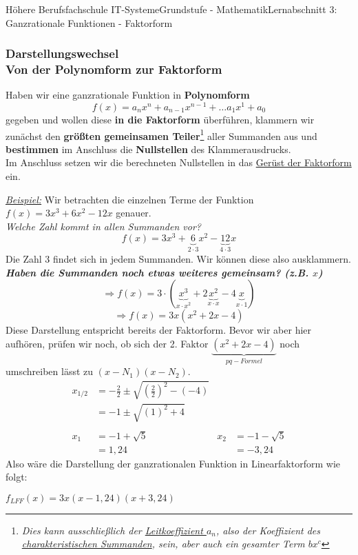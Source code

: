 \documentclass[11pt,twocolumn,oneside,openany,headings=optiontotoc,11pt,numbers=noenddot]{article}
\begin{document}
\begin{worksheet}{Höhere Berufsfachschule IT-Systeme}{Grundstufe - Mathematik}{Lernabschnitt 3: Ganzrationale Funktionen - Faktorform}
		\subsubsection{Darstellungswechsel\\Von der Polynomform zur Faktorform}
		Haben wir eine ganzrationale Funktion in \textbf{Polynomform} \[f(x) = a_nx^n + a_{n-1}x^{n-1} + \ldots a_1x^1 + a_0\] gegeben und wollen diese \textbf{in die Faktorform} überführen, klammern wir zunächst den \textbf{größten gemeinsamen Teiler}\footnote{\textit{Dies kann ausschließlich der \underline{Leitkoeffizient \(a_n\)}, also der Koeffizient des \underline{charakteristischen Summanden}, sein, aber auch ein gesamter Term \(bx^c\)}} aller Summanden aus und \textbf{bestimmen} im Anschluss die \textbf{Nullstellen} des Klammerausdrucks.\\
		Im Anschluss setzen wir die berechneten Nullstellen in das \underline{Gerüst der Faktorform} ein.\\
		\par\noindent
		\underline{\textit{Beispiel:}} Wir betrachten die einzelnen Terme der Funktion \(f(x) = 3x^3 + 6x^2 -12x\) genauer.\\
		\textit{Welche Zahl kommt in allen Summanden vor?}
		\[f(x) = 3x^3 + \underbrace{6}_{2\cdot{}3}x^2 - \underbrace{12}_{4\cdot{}3}x\]
		Die Zahl \(3\) findet sich in jedem Summanden. Wir können diese also ausklammern. \textit{\textbf{\textit{Haben die Summanden noch etwas weiteres gemeinsam? (z.B. \(x\))}}}
		\[\Rightarrow f(x) = 3\cdot{}(\underbrace{x^3}_{x\cdot{}x^2} +2\underbrace{x^2}_{x\cdot{}x} -4\underbrace{x}_{x\cdot{}1})\]
		\[\Rightarrow f(x) = 3x(x^2 +2x -4)\]
		Diese Darstellung entspricht bereits der Faktorform. Bevor wir aber hier aufhören, prüfen wir noch, ob sich der 2. Faktor \(\underbrace{(x^2+2x-4)}_{pq-Formel}\) noch umschreiben lässt zu \((x-N_1)(x-N_2)\).\\
		\begin{align*}
			x_{1/2} & = -\frac{2}{2} \pm \sqrt{\left(\frac{2}{2}\right)^2 - (-4)}\\
			& = -1 \pm \sqrt{(1)^2 + 4}\\
			\\
			x_1 & = -1 + \sqrt{5} & x_2 & = -1 - \sqrt{5}\\
			& = 1,24 & & = -3,24
		\end{align*}
		Also wäre die Darstellung der ganzrationalen Funktion in Linearfaktorform wie folgt:
		\begin{center}
			\colorbox{green!10}{\(f_{LFF}(x) = 3x(x-1,24)(x+3,24)\)}
		\end{center}
	\end{worksheet}
\end{document}
